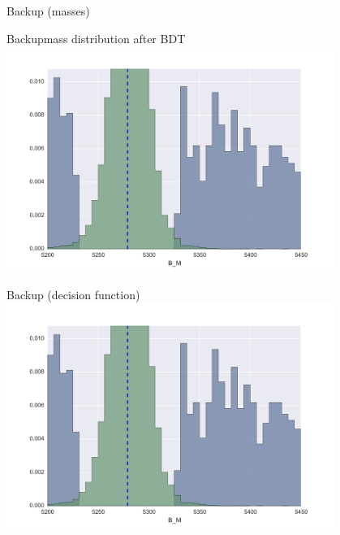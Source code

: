 \documentclass[compress,aspectratio=1610]{beamer}
\begin{document}
\begin{frame}{Backup (\PKstar masses)}
  \centering
\end{frame}

\begin{frame}{Backup}{\PDzero mass distribution after BDT}
  \centering
  \includegraphics[page=1,width=0.8\textwidth]{./figures/final.pdf}
\end{frame}

\begin{frame}{Backup (\PDzero decision function)}
  \centering
  \includegraphics[page=69,width=0.8\textwidth]{./figures/final.pdf}
\end{frame}
\end{document}
